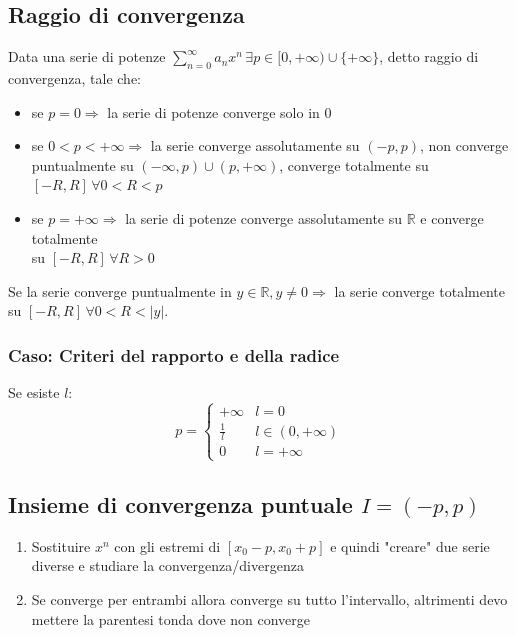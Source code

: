 \documentclass[10pt, a4paper]{article}
\begin{document}
    \subsection{Raggio di convergenza}
        Data una serie di potenze $\sum_{n=0}^{\infty}a_n x^n \, \exists p \in [0,+\infty)\cup\{+\infty\}$, detto raggio di convergenza, tale che:
        \begin{itemize}
            \item se $p=0 \Rightarrow$ la serie di potenze converge solo in 0
            \item se $0<p<+\infty \Rightarrow$ la serie converge assolutamente su $(-p,p)$, non converge puntualmente su $(-\infty,p)\cup(p,+\infty)$, converge totalmente su $[-R,R] \,\forall 0<R<p$
            \item se $p=+\infty \Rightarrow$ la serie di potenze converge assolutamente su $\mathbb{R}$ e converge totalmente\\
            su $[-R,R] \, \forall R>0$
        \end{itemize}
        Se la serie converge puntualmente in $y\in\mathbb{R}, y\neq 0 \Rightarrow$ la serie converge totalmente su $[-R,R]\, \forall 0<R<\left|y\right|$.
        \subsubsection{Caso: Criteri del rapporto e della radice}
            Se esiste $l$:
            \begin{equation*}
                p=\begin{cases}
                    +\infty & l = 0\\
                    \frac{1}{l} & l\in(0,+\infty)\\
                    0  & l = +\infty
                \end{cases}
            \end{equation*}
    \subsection{Insieme di convergenza puntuale $I=(-p,p)$}
        \begin{enumerate}
            \item Sostituire $x^n$ con gli estremi di $\left[x_0-p,x_0+p\right]$ e quindi "creare" due serie diverse e studiare la convergenza/divergenza
            \item Se converge per entrambi allora converge su tutto l'intervallo, altrimenti devo mettere la parentesi tonda dove non converge
        \end{enumerate}
    \iffalse
\end{document}
